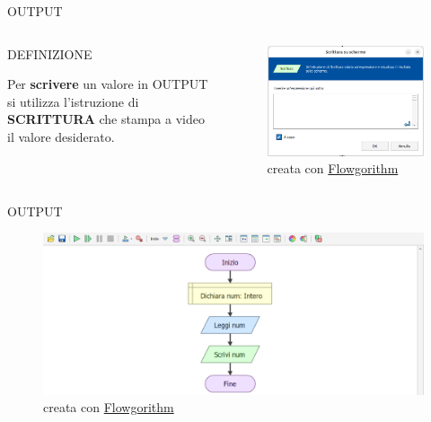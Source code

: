 \documentclass[aspectratio=1610, handout]{beamer}
\begin{document}
\begin{frame}{OUTPUT}
    \begin{columns}
            \begin{alertblock}{DEFINIZIONE}
                \begin{minipage}{0.96\linewidth}
                    \justifying 
                    Per \textbf{scrivere} un valore in OUTPUT si 
                    utilizza l’istruzione di \textbf{SCRITTURA} che stampa a 
                    video il valore desiderato.
                \end{minipage}
            \end{alertblock}
            \begin{figure}
                \includegraphics[width=\linewidth]{img/output.png}
                \caption{{creata con \href{http://www.flowgorithm.org/}{Flowgorithm}}}
            \end{figure}
    \end{columns}
\end{frame}

\begin{frame}{OUTPUT}
    \begin{figure}
        \includegraphics[width=\linewidth]{img/output2.png}
        \caption{{creata con \href{http://www.flowgorithm.org/}{Flowgorithm}}}
    \end{figure}
\end{frame}
\end{document}
